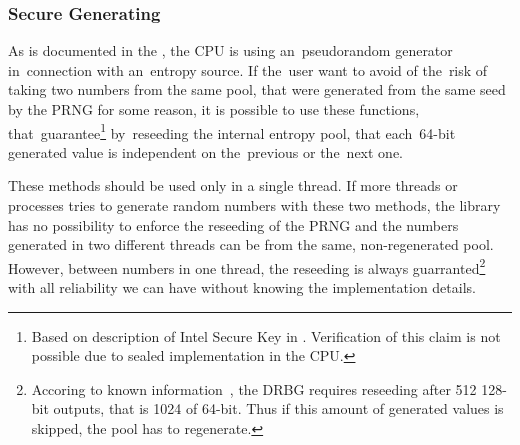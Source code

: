 \\

\\

\\

\\

\\

\subsubsection{Secure Generating}\label{subsec:api:secure}
As is documented in the , the CPU is using an~pseudorandom generator in~connection with an~entropy source. If the~user want to avoid of the~risk of taking two numbers from the same pool, that were generated from the same seed by the PRNG for some reason, it is possible to use these functions, that~guarantee\footnote{Based on description of Intel Secure Key in . Verification of this claim is not possible due to sealed implementation in the CPU.} by~reseeding the internal entropy pool, that each~64-bit generated value is independent on the~previous or the~next one. 

These methods should be used only in a single thread. 
If more threads or processes tries to generate random numbers with these two methods, 
the library has no possibility to enforce the reseeding of the PRNG and the numbers generated 
in two different threads can be from the same, non-regenerated pool.
However, between numbers in one thread, 
the reseeding is always guarranted\footnote{Accoring to known information~\cite[sec.~2.4.2]{AnalysisOfDRNG}, the DRBG requires reseeding after 512 128-bit outputs, that is 1024 of 64-bit. 
Thus if this amount of generated values is skipped, the pool has to regenerate.} 
with all reliability we can have without knowing the implementation details.





